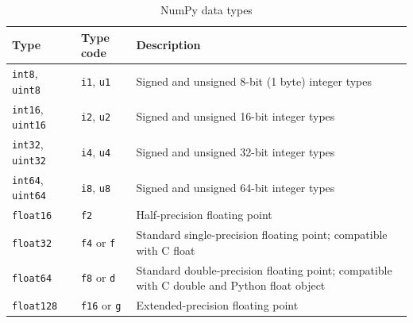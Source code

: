 \begin{table}
    \caption{NumPy data types}
    \label{NumPy data types}
    \begin{tabularx}{\textwidth}{llX}
        \hline
        Type                                                   & Type code                         & Description                                                                                                                 \\
        \hline
        \verb|int8|, \verb|uint8|                              & \verb|i1|, \verb|u1|              & Signed and unsigned 8-bit (1 byte) integer types                                                                            \\
        \verb|int16|, \verb|uint16|                            & \verb|i2|, \verb|u2|              & Signed and unsigned 16-bit integer types                                                                                    \\
        \verb|int32|, \verb|uint32|                            & \verb|i4|, \verb|u4|              & Signed and unsigned 32-bit integer types                                                                                    \\
        \verb|int64|, \verb|uint64|                            & \verb|i8|, \verb|u8|              & Signed and unsigned 64-bit integer types                                                                                    \\
        \verb|float16|                                         & \verb|f2|                         & Half-precision floating point                                                                                               \\
        \verb|float32|                                         & \verb|f4| or \verb|f|             & Standard single-precision floating point; compatible with C float                                                           \\
        \verb|float64|                                         & \verb|f8| or \verb|d|             & Standard double-precision floating point; compatible with C double and Python float object                                  \\
        \verb|float128|                                        & \verb|f16| or \verb|g|            & Extended-precision floating point                                                                                           \\

\end{tabularx}
\end{table}
